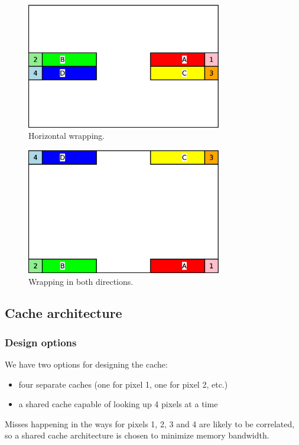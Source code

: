 \documentclass[a4paper,11pt]{article}
\begin{document}
\begin{figure}[H]
\centering
\includegraphics[height=55mm]{dist_wrap2.eps}
\caption{Horizontal wrapping.}\label{fig:casewrap2}
\end{figure}

\begin{figure}[H]
\centering
\includegraphics[height=55mm]{dist_wrap3.eps}
\caption{Wrapping in both directions.}\label{fig:casewrap3}
\end{figure}

\subsection{Cache architecture}
\subsubsection{Design options}
We have two options for designing the cache:
\begin{itemize}
\item four separate caches (one for pixel 1, one for pixel 2, etc.)
\item a shared cache capable of looking up 4 pixels at a time
\end{itemize}

Misses happening in the ways for pixels 1, 2, 3 and 4 are likely to be correlated, so a shared cache architecture is chosen to minimize memory bandwidth.
\end{document}
